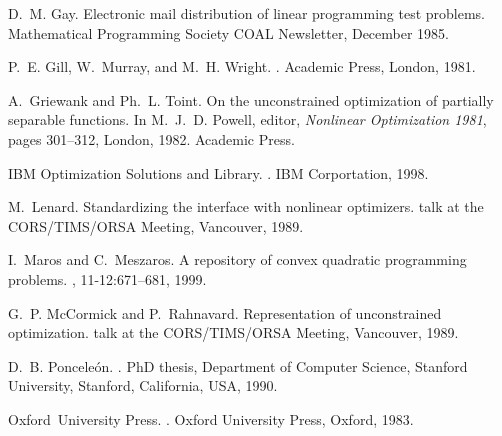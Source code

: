 \documentclass[a4paper]{article}
\begin{document}
\begin{thebibliography}{10}
D.~M. Gay.
\newblock Electronic mail distribution of linear programming test problems.
\newblock Mathematical Programming Society COAL Newsletter, December 1985.

P.~E. Gill, W.~Murray, and M.~H. Wright.
.
\newblock Academic Press, London, 1981.

A.~Griewank and Ph.~L. Toint.
\newblock On the unconstrained optimization of partially separable functions.
\newblock In M.~J.~D. Powell, editor, {\em Nonlinear Optimization 1981}, pages
  301--312, London, 1982. Academic Press.

{IBM Optimization Solutions and Library}.
.
\newblock IBM Corportation, 1998.

M.~Lenard.
\newblock Standardizing the interface with nonlinear optimizers.
\newblock talk at the CORS/TIMS/ORSA Meeting, Vancouver, 1989.

I.~Maros and C.~Meszaros.
\newblock A repository of convex quadratic programming problems.
, 11-12:671--681, 1999.

G.~P. McCormick and P.~Rahnavard.
\newblock Representation of unconstrained optimization.
\newblock talk at the CORS/TIMS/ORSA Meeting, Vancouver, 1989.

D.~B. Poncele\'{o}n.
.
\newblock PhD thesis, Department of Computer Science, Stanford University,
  Stanford, California, USA, 1990.

Oxford~University Press.
.
\newblock Oxford University Press, Oxford, 1983.

\end{thebibliography}
\end{document}
